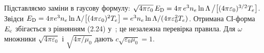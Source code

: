 \begin{derivation}
Підставляємо заміни в гаусову формулу:
$\sqrt{4\pi\varepsilon_0}\,E_{\mathrm{D}}=4\pi\,e^3n_e\ln\Lambda\,\big/\big[(4\pi\varepsilon_0)^{3/2}T_e\big]$.
Звідси $E_{\mathrm{D}}=4\pi e^3n_e\ln\Lambda/\big[(4\pi\varepsilon_0)^2T_e\big]=e^3n_e\ln\Lambda/(4\pi\varepsilon_0^2T_e)$.
Отримана СІ-форма $E_{\mathrm{c}}$ збігається з рівнянням (2.24) у~\cite{Hoppe2022}; це незалежна перевірка
правила. Для $\omega$ множники $\sqrt{4\pi\varepsilon_0}$ і $\sqrt{4\pi/\mu_0}$ дають
$c\sqrt{\varepsilon_0\mu_0}=1$.
\end{derivation}
